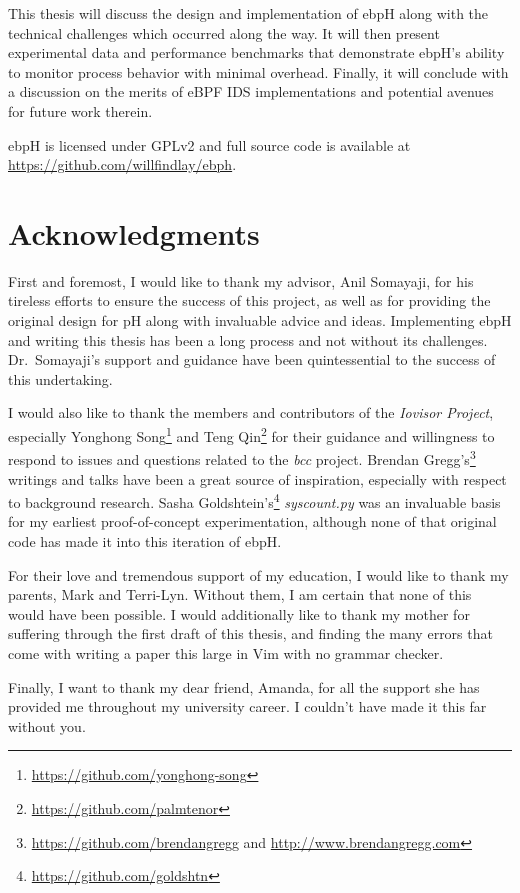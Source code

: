 \documentclass[
  12pt]{findlay}
\begin{document}
This thesis will discuss the design and implementation of ebpH along
with the technical challenges which occurred along the way. It will then
present experimental data and performance benchmarks that demonstrate
ebpH's ability to monitor process behavior with minimal overhead.
Finally, it will conclude with a discussion on the merits of eBPF IDS
implementations and potential avenues for future work therein.

ebpH is licensed under GPLv2 and full source code is available at
\url{https://github.com/willfindlay/ebph}.

\newpage
\section*{Acknowledgments}

First and foremost, I would like to thank my advisor, Anil Somayaji, for
his tireless efforts to ensure the success of this project, as well as
for providing the original design for pH along with invaluable advice
and ideas. Implementing ebpH and writing this thesis has been a long
process and not without its challenges. Dr.~Somayaji's support and
guidance have been quintessential to the success of this undertaking.

I would also like to thank the members and contributors of the
\emph{Iovisor Project}, especially Yonghong
Song\footnote{\url{https://github.com/yonghong-song}} and Teng
Qin\footnote{\url{https://github.com/palmtenor}} for their guidance and
willingness to respond to issues and questions related to the \emph{bcc}
project. Brendan
Gregg's\footnote{\url{https://github.com/brendangregg} and \url{http://www.brendangregg.com}}
writings and talks have been a great source of inspiration, especially
with respect to background research. Sasha
Goldshtein's\footnote{\url{https://github.com/goldshtn}}
\emph{syscount.py} was an invaluable basis for my earliest
proof-of-concept experimentation, although none of that original code
has made it into this iteration of ebpH.

For their love and tremendous support of my education, I would like to
thank my parents, Mark and Terri-Lyn. Without them, I am certain that
none of this would have been possible. I would additionally like to
thank my mother for suffering through the first draft of this thesis,
and finding the many errors that come with writing a paper this large in
Vim with no grammar checker.

Finally, I want to thank my dear friend, Amanda, for all the support she
has provided me throughout my university career. I couldn't have made it
this far without you.
\end{document}
